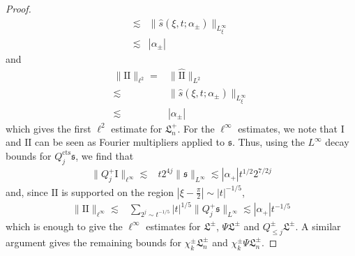 \documentclass[10pt,a4paper]{amsart}
\newcommand{\fL}{\mathfrak{L}}
\newcommand{\fhPi}{\frac{\pi}{2}}
\newcommand{\fs}{\mathfrak{s}}
\newcommand{\rmII}{\mathrm{II}}
\newcommand{\rmI}{\mathrm{I}}
\newcommand{\tcts}{\text{cts}}
\begin{document}
\begin{proof}
\begin{equation*}
\begin{split}
        \lesssim& \lVert \hat{s}(\xi,t;\alpha_\pm) \rVert_{L^\infty_\xi}\\
        \lesssim& |\alpha_{\pm}|
    \end{split}\end{equation*}
    and
    \begin{equation*}\begin{split}
        \lVert \rmII \rVert_{\ell^2} =& \lVert \hat{\rmII} \rVert_{L^2}\\
        \lesssim& \lVert \hat{s}(\xi,t;\alpha_\pm) \rVert_{L^\infty_\xi}\\
        \lesssim& |\alpha_{\pm}|
    \end{split}
    \end{equation*}
    which gives the first $\ell^2$ estimate for $\fL_n^+$.  For the $\ell^\infty$ estimates, we note that $\rmI$ and $\rmII$ can be seen as Fourier multipliers applied to $\fs$.  Thus, using the $L^\infty$ decay bounds for $Q_j^\tcts \fs$, we find that
    \begin{equation*}\begin{split}
        \lVert Q_j^+ \rmI \rVert_{\ell^\infty} \lesssim& t 2^{4j} \lVert \fs \rVert_{L^\infty} \lesssim |\alpha_{+}| t^{1/2} 2^{7/2j}
    \end{split}\end{equation*}
    and, since $\rmII$ is supported on the region $|\xi - \fhPi| \sim |t|^{-1/5}$, 
    \begin{equation*}\begin{split}
        \lVert \rmII \rVert_{\ell^\infty} \lesssim& \sum_{2^j \sim t^{-1/5}} |t|^{1/5} \lVert Q_j^+ \fs \rVert_{L^\infty} \lesssim |\alpha_{+}| t^{-1/5}
    \end{split}\end{equation*}
    which is enough to give the  $\ell^\infty$ estimates for $\fL^\pm$, $\Psi \fL^\pm$ and $Q_{\leq j}^\pm \fL^\pm$.  A similar argument gives the remaining bounds for $\chi_k^\pm \fL_n^\pm$ and $\chi_k^\pm \Psi \fL_n^\pm$.
    

\end{proof}
\end{document}

